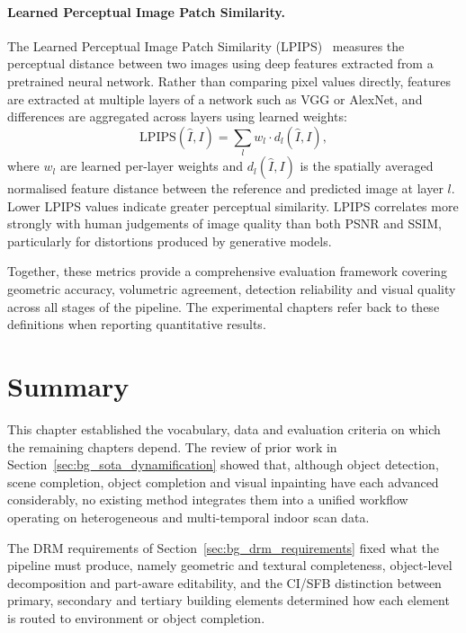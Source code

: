 \paragraph{Learned Perceptual Image Patch Similarity.}
The Learned Perceptual Image Patch Similarity (\gls{LPIPS})~\cite{zhang_unreasonable_2018} measures the perceptual distance between two images using deep features extracted from a pretrained neural network. Rather than comparing pixel values directly, features are extracted at multiple layers of a network such as VGG or AlexNet, and differences are aggregated across layers using learned weights:
\begin{equation}
\label{eq:lpips}
\text{LPIPS}(\hat{I}, I) = \sum_l w_l \cdot d_l(\hat{I}, I),
\end{equation}
where $w_l$ are learned per-layer weights and $d_l(\hat{I}, I)$ is the spatially averaged normalised feature distance between the reference and predicted image at layer $l$. Lower \gls{LPIPS} values indicate greater perceptual similarity. \gls{LPIPS} correlates more strongly with human judgements of image quality than both \gls{PSNR} and \gls{SSIM}, particularly for distortions produced by generative models.

Together, these metrics provide a comprehensive evaluation framework covering geometric accuracy, volumetric agreement, detection reliability and visual quality across all stages of the pipeline. The experimental chapters refer back to these definitions when reporting quantitative results.

\section{Summary}
\label{sec:bg_conclusion}

This chapter established the vocabulary, data and evaluation criteria on which the remaining chapters depend. The review of prior work in Section~\ref{sec:bg_sota_dynamification} showed that, although object detection, scene completion, object completion and visual inpainting have each advanced considerably, no existing method integrates them into a unified workflow operating on heterogeneous and multi-temporal indoor scan data.

The \gls{DRM} requirements of Section~\ref{sec:bg_drm_requirements} fixed what the pipeline must produce, namely geometric and textural completeness, object-level decomposition and part-aware editability, and the \gls{CI/SFB} distinction between primary, secondary and tertiary building elements determined how each element is routed to environment or object completion.

